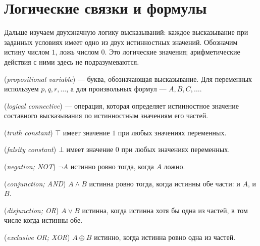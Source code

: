 \ifdim\dimexpr\ht\CatFlowBox+\dp\CatFlowBox\relax<64mm\dp\CatFlowBox=\dimexpr64mm-\ht\CatFlowBox\relax\fi%
\noindent\usebox{\CatFlowBox}\par\addvspace{5pt}


\section{Логические связки и формулы}
Дальше изучаем двухзначную логику высказываний: каждое высказывание при заданных условиях имеет одно из двух истинностных значений. Обозначим истину числом \(1\), ложь числом \(0\). Это логические значения; арифметические действия с ними здесь не подразумеваются.

\begin{definition} (\emph{propositional variable}) — буква, обозначающая высказывание. Для переменных используем \(p,q,r,\ldots\), а для произвольных формул — \(A,B,C,\ldots\).\end{definition}
\begin{definition} (\emph{logical connective}) — операция, которая определяет истинностное значение составного высказывания по истинностным значениям его частей.\end{definition}
\begin{definition} (\emph{truth constant}) \(\top\) имеет значение \(1\) при любых значениях переменных.\end{definition}
\begin{definition} (\emph{falsity constant}) \(\bot\) имеет значение \(0\) при любых значениях переменных.\end{definition}
\begin{definition} (\emph{negation; NOT}) \(\neg A\) истинно ровно тогда, когда \(A\) ложно.\end{definition}
\begin{definition} (\emph{conjunction; AND}) \(A\land B\) истинна ровно тогда, когда истинны обе части: и \(A\), и \(B\).\end{definition}
\begin{definition} (\emph{disjunction; OR}) \(A\lor B\) истинна, когда истинна хотя бы одна из частей, в том числе когда истинны обе.\end{definition}
\begin{definition} (\emph{exclusive OR; XOR}) \(A\oplus B\) истинно, когда истинна ровно одна из частей.\end{definition}
